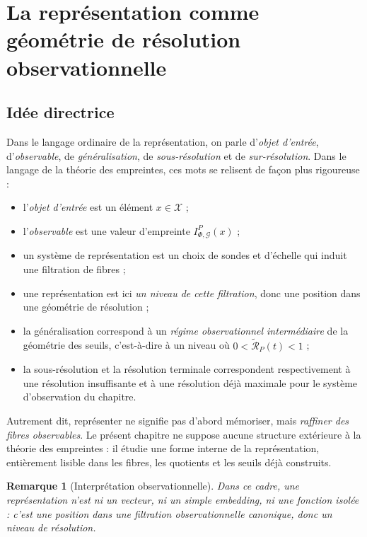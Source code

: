 \documentclass[11pt,a4paper,openany]{book}
\newtheorem{remark}[definition]{Remarque}
\begin{document}
\section{La représentation comme géométrie de résolution observationnelle}

\subsection{Idée directrice}

Dans le langage ordinaire de la représentation, on parle d'\emph{objet d'entrée}, d'\emph{observable}, de \emph{généralisation}, de \emph{sous-résolution} et de \emph{sur-résolution}.  
Dans le langage de la théorie des empreintes, ces mots se relisent de façon plus rigoureuse :

\begin{itemize}[leftmargin=1.4em]
\item l'\emph{objet d'entrée} est un élément \(x\in\mathcal X\) ;
\item l'\emph{observable} est une valeur d'empreinte \(I_{\Phi,\mathcal G}^P(x)\) ;
\item un système de représentation est un choix de sondes et d'échelle qui induit une filtration de fibres ;
\item une représentation est ici \emph{un niveau de cette filtration}, donc une position dans une géométrie de résolution ;
\item la généralisation correspond à un \emph{régime observationnel intermédiaire} de la géométrie des seuils, c'est-à-dire à un niveau où \(0<\widetilde{\mathcal R}_P(t)<1\) ;
\item la sous-résolution et la résolution terminale correspondent respectivement à une résolution insuffisante et à une résolution déjà maximale pour le système d'observation du chapitre.
\end{itemize}

Autrement dit, représenter ne signifie pas d'abord mémoriser, mais \emph{raffiner des fibres observables}.  
Le présent chapitre ne suppose aucune structure extérieure à la théorie des empreintes : il étudie une forme interne de la représentation, entièrement lisible dans les fibres, les quotients et les seuils déjà construits.

\begin{remark}[Interprétation observationnelle]
Dans ce cadre, une représentation n'est ni un vecteur, ni un simple embedding, ni une fonction isolée : c'est une position dans une filtration observationnelle canonique, donc un niveau de résolution.
\end{remark}
\end{document}
